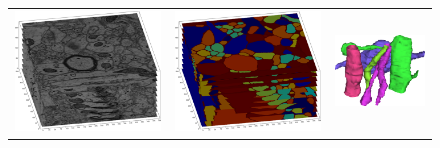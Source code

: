 \begin{figure}[htpb]
\begin{tabular}{XXX}
	\includegraphics[height=\myheight,width=\mywidth]{data/images/imStack.png}&
	\includegraphics[height=\myheight,width=\mywidth]{data/images/segStack.png}&
	\includegraphics[height=\myheight,width=\mywidth]{data/images/seg3d.png}\\

\end{tabular}
\end{figure}
